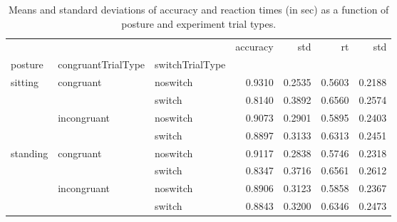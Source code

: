 \begin{table}
\centering
\caption{Means and standard deviations of accuracy and reaction times (in sec) as a function of posture and experiment trial types.}
\label{table-task-switching-replication-reaction-time}
\begin{tabular}{lllrrrr}
\toprule
         &             &        & accuracy &    std &     rt &    std \\
posture & congruantTrialType & switchTrialType &          &        &        &        \\
\midrule
sitting & congruant & noswitch &   0.9310 & 0.2535 & 0.5603 & 0.2188 \\
         &             & switch &   0.8140 & 0.3892 & 0.6560 & 0.2574 \\
         & incongruant & noswitch &   0.9073 & 0.2901 & 0.5895 & 0.2403 \\
         &             & switch &   0.8897 & 0.3133 & 0.6313 & 0.2451 \\
standing & congruant & noswitch &   0.9117 & 0.2838 & 0.5746 & 0.2318 \\
         &             & switch &   0.8347 & 0.3716 & 0.6561 & 0.2612 \\
         & incongruant & noswitch &   0.8906 & 0.3123 & 0.5858 & 0.2367 \\
         &             & switch &   0.8843 & 0.3200 & 0.6346 & 0.2473 \\
\bottomrule
\end{tabular}
\end{table}
